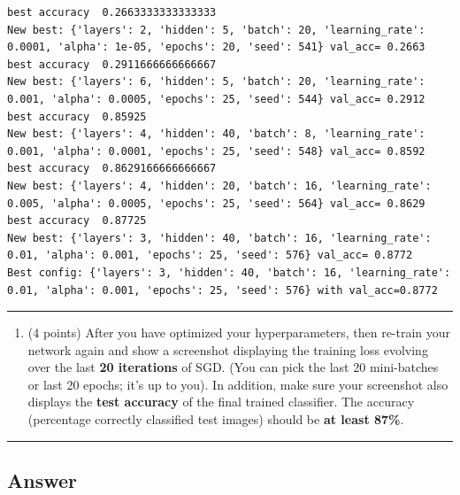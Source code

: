 \documentclass[
  letterpaper,
  DIV=11,
  numbers=noendperiod]{scrartcl}
\newenvironment{Shaded}{\begin{snugshade}}{\end{snugshade}}
\providecommand{\tightlist}{%
  \setlength{\itemsep}{0pt}\setlength{\parskip}{0pt}}\usepackage{longtable,booktabs,array}
\begin{document}
\label{prob2_2}
\begin{verbatim}
best accuracy  0.2663333333333333
New best: {'layers': 2, 'hidden': 5, 'batch': 20, 'learning_rate': 0.0001, 'alpha': 1e-05, 'epochs': 20, 'seed': 541} val_acc= 0.2663
best accuracy  0.2911666666666667
New best: {'layers': 6, 'hidden': 5, 'batch': 20, 'learning_rate': 0.001, 'alpha': 0.0005, 'epochs': 25, 'seed': 544} val_acc= 0.2912
best accuracy  0.85925
New best: {'layers': 4, 'hidden': 40, 'batch': 8, 'learning_rate': 0.001, 'alpha': 0.0001, 'epochs': 25, 'seed': 548} val_acc= 0.8592
best accuracy  0.8629166666666667
New best: {'layers': 4, 'hidden': 20, 'batch': 16, 'learning_rate': 0.005, 'alpha': 0.0005, 'epochs': 25, 'seed': 564} val_acc= 0.8629
best accuracy  0.87725
New best: {'layers': 3, 'hidden': 40, 'batch': 16, 'learning_rate': 0.01, 'alpha': 0.001, 'epochs': 25, 'seed': 576} val_acc= 0.8772
Best config: {'layers': 3, 'hidden': 40, 'batch': 16, 'learning_rate': 0.01, 'alpha': 0.001, 'epochs': 25, 'seed': 576} with val_acc=0.8772
\end{verbatim}

\begin{center}\rule{0.5\linewidth}{0.5pt}\end{center}

\begin{enumerate}
\def\labelenumi{\arabic{enumi}.}
\setcounter{enumi}{2}
\tightlist
\item
  (4 points) After you have optimized your hyperparameters, then
  re-train your network again and show a screenshot displaying the
  training loss evolving over the last \textbf{20 iterations} of SGD.
  (You can pick the last 20 mini-batches or last 20 epochs; it's up to
  you). In addition, make sure your screenshot also displays the
  \textbf{test accuracy} of the final trained classifier. The accuracy
  (percentage correctly classified test images) should be \textbf{at
  least 87\%}.
\end{enumerate}

\begin{center}\rule{0.5\linewidth}{0.5pt}\end{center}

\subsection{Answer}\label{answer-5}

\begin{Shaded}
\begin{Highlighting}[]

\end{Highlighting}
\end{Shaded}
\end{document}
